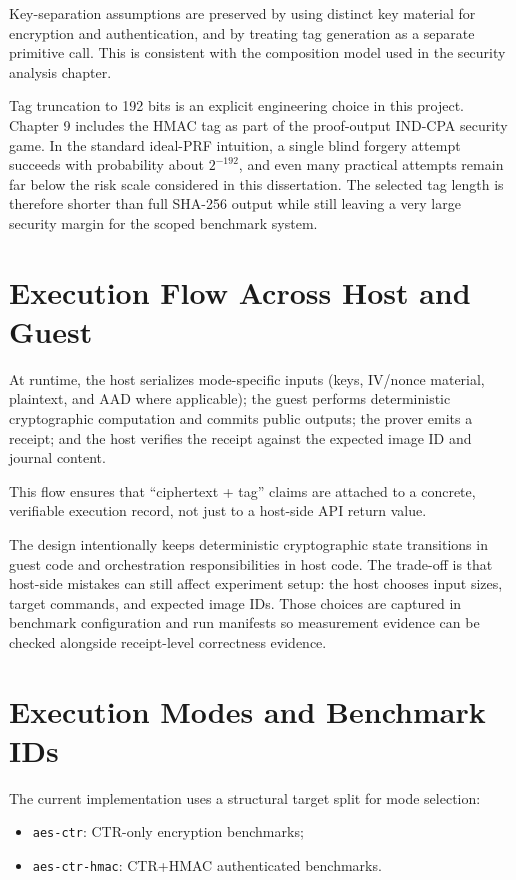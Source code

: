 Key-separation assumptions are preserved by using distinct key material for
encryption and authentication, and by treating tag generation as a separate
primitive call. This is consistent with the composition model used in the
security analysis chapter.

Tag truncation to 192 bits is an explicit engineering choice in this project.
Chapter 9 includes the HMAC tag as part of the proof-output IND-CPA security
game.
In the standard ideal-PRF intuition, a single blind forgery attempt succeeds with
probability about \(2^{-192}\), and even many practical attempts remain far below
the risk scale considered in this dissertation. The selected tag length is
therefore shorter than full SHA-256 output while still leaving a very large
security margin for the scoped benchmark system.

\section{Execution Flow Across Host and Guest}

At runtime, the host serializes mode-specific inputs (keys, IV/nonce material,
plaintext, and AAD where applicable); the guest performs deterministic
cryptographic computation and commits
public outputs; the prover emits a receipt; and the host verifies the receipt
against the expected image ID and journal content.

This flow ensures that ``ciphertext + tag'' claims are attached to a concrete,
verifiable execution record, not just to a host-side API return value.

The design intentionally keeps deterministic cryptographic state transitions in
guest code and orchestration responsibilities in host code. The trade-off is that
host-side mistakes can still affect experiment setup: the host chooses input
sizes, target commands, and expected image IDs. Those choices are captured in
benchmark configuration and run manifests so measurement evidence can be checked
alongside receipt-level correctness evidence.

\section{Execution Modes and Benchmark IDs}

The current implementation uses a structural target split for mode selection:

\begin{itemize}
\item \texttt{aes-ctr}: CTR-only encryption benchmarks;
\item \texttt{aes-ctr-hmac}: CTR+HMAC authenticated benchmarks.
\end{itemize}

